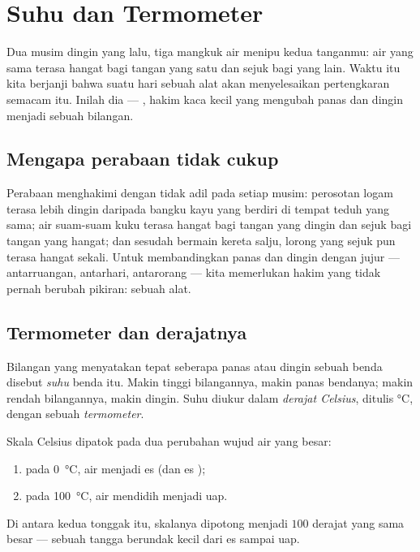 \chapter{Suhu dan Termometer}\label{ch:g3:temperature-thermometers}

Dua musim dingin yang lalu, tiga mangkuk air menipu kedua tanganmu:
air yang sama terasa hangat bagi tangan yang satu dan sejuk bagi yang
lain. Waktu itu kita berjanji bahwa suatu hari sebuah alat akan
menyelesaikan pertengkaran semacam itu. Inilah dia --- ,
hakim kaca kecil yang mengubah panas dan dingin menjadi sebuah
bilangan.

\section{Mengapa perabaan tidak cukup}

\begin{example}\label{ex:g3:temperature-thermometers:unfair}
Perabaan menghakimi dengan tidak adil pada setiap musim: perosotan
logam terasa lebih dingin daripada bangku kayu yang berdiri di tempat
teduh yang sama; air suam-suam kuku terasa hangat bagi tangan yang
dingin dan sejuk bagi tangan yang hangat; dan sesudah bermain kereta
salju, lorong yang sejuk pun terasa hangat sekali. Untuk membandingkan
panas dan dingin dengan jujur --- antarruangan, antarhari, antarorang
--- kita memerlukan hakim yang tidak pernah berubah pikiran: sebuah
alat.
\end{example}

\section{Termometer dan derajatnya}

\begin{definition}[Suhu]\label{def:g3:temperature-thermometers:temperature}
Bilangan yang menyatakan tepat seberapa panas atau dingin sebuah benda
disebut \emph{suhu} benda itu. Makin tinggi bilangannya,
makin panas bendanya; makin rendah bilangannya, makin dingin. Suhu
diukur dalam \emph{derajat Celsius}, ditulis
\unit{\celsius}, dengan sebuah \emph{termometer}.
\end{definition}

\begin{proposition}\label{prop:g3:temperature-thermometers:milestones}
Skala Celsius dipatok pada dua perubahan wujud air yang besar:
\begin{enumerate}
  \item pada \qty{0}{\celsius}, air  menjadi es (dan es
        );
  \item pada \qty{100}{\celsius}, air mendidih menjadi uap.
\end{enumerate}
Di antara kedua tonggak itu, skalanya dipotong menjadi $100$ derajat
yang sama besar --- sebuah tangga berundak kecil dari es sampai uap.
\end{proposition}

